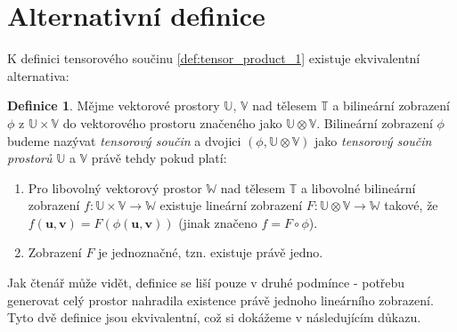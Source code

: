 \documentclass[a5paper,12pt]{amsbook}
\theoremstyle{definition}
\newtheorem{definition}{Definice}[chapter]
\newcommand{\myvec}[1]{\mathbf{#1}}
\newcommand{\myspace}[1]{\mathbb{#1}}
\begin{document}
\section{Alternativní definice}

\noindent
K definici tensorového součinu \ref{def:tensor_product_1} existuje ekvivalentní alternativa:
\begin{definition}
\label{def:tensor_product_2}
Mějme vektorové prostory $\myspace{U}$, $\myspace{V}$ nad tělesem $\myspace{T}$ a bilineární zobrazení
$\phi$ z $\myspace{U}\times\myspace{V}$ do vektorového prostoru značeného jako
$\myspace{U}\otimes\myspace{V}$. Bilineární zobrazení $\phi$ budeme nazývat \textit{tensorový součin}
a dvojici $(\phi, \myspace{U}\otimes\myspace{V})$ jako \textit{tensorový součin prostorů} $\myspace{U}$
a $\myspace{V}$ právě tehdy pokud platí:
\begin{enumerate}	
\item Pro libovolný vektorový prostor $\myspace{W}$ nad tělesem $\myspace{T}$ a libovolné bilineární
	zobrazení $f: \myspace{U}\times\myspace{V}\rightarrow\myspace{W}$ existuje lineární zobrazení
	$F: \myspace{U}\otimes\myspace{V}\rightarrow\myspace{W}$ takové, že $f(\myvec{u}, \myvec{v})
	= F(\phi(\myvec{u}, \myvec{v}))$ (jinak značeno $f = F \circ \phi$).
\item Zobrazení $F$ je jednoznačné, tzn. existuje právě jedno.
\end{enumerate}
\end{definition}
Jak čtenář může vidět, definice se liší pouze v druhé podmínce - potřebu generovat celý prostor
nahradila existence právě jednoho lineárního zobrazení. Tyto dvě definice jsou ekvivalentní, což
si dokážeme v následujícím důkazu.
\end{document}

